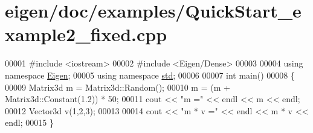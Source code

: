 \hypertarget{eigen_2doc_2examples_2_quick_start__example2__fixed_8cpp_source}{}\section{eigen/doc/examples/\+Quick\+Start\+\_\+example2\+\_\+fixed.cpp}
\label{eigen_2doc_2examples_2_quick_start__example2__fixed_8cpp_source}

\begin{DoxyCode}
00001 \textcolor{preprocessor}{#include <iostream>}
00002 \textcolor{preprocessor}{#include <Eigen/Dense>}
00003 
00004 \textcolor{keyword}{using namespace }\hyperlink{namespace_eigen}{Eigen};
00005 \textcolor{keyword}{using namespace }\hyperlink{namespacestd}{std};
00006 
00007 \textcolor{keywordtype}{int} main()
00008 \{
00009   Matrix3d m = Matrix3d::Random();
00010   m = (m + Matrix3d::Constant(1.2)) * 50;
00011   cout << \textcolor{stringliteral}{"m ="} << endl << m << endl;
00012   Vector3d v(1,2,3);
00013   
00014   cout << \textcolor{stringliteral}{"m * v ="} << endl << m * v << endl;
00015 \}
\end{DoxyCode}
